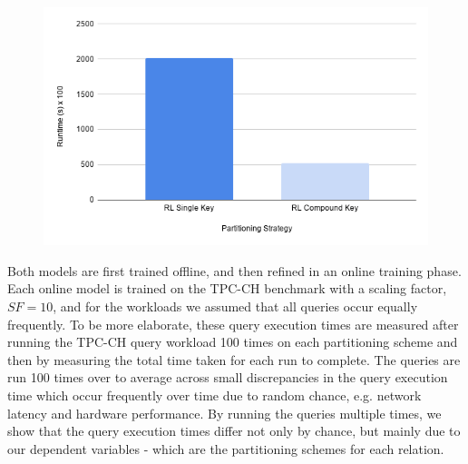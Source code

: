 \begin{figure}[hb]
  \centering
  \includegraphics[width=\linewidth]{figures/skvsck-query-runtimes.png}
  \label{fig:skvsck}
\end{figure}

Both models are first trained offline, and then refined in an online training phase. Each online model is trained on the TPC-CH benchmark with a scaling factor, $SF=10$, and for the workloads we assumed that all queries occur equally frequently. To be more elaborate, these query execution times are measured after running the TPC-CH query workload 100 times on each partitioning scheme and then by measuring the total time taken for each run to complete. The queries are run 100 times over to average across small discrepancies in the query execution time which occur frequently over time due to random chance, e.g. network latency and hardware performance. By running the queries multiple times, we show that the query execution times differ not only by chance, but mainly due to our dependent variables - which are the partitioning schemes for each relation. 

